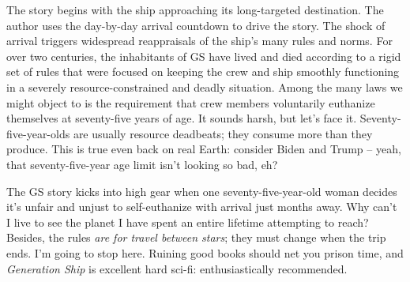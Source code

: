 The story begins with the ship approaching its long-targeted
destination. The author uses the day-by-day arrival countdown to drive
the story. The shock of arrival triggers widespread reappraisals of the
ship's many rules and norms. For over two centuries, the inhabitants of
GS have lived and died according to a rigid set of rules that were
focused on keeping the crew and ship smoothly functioning in a severely
resource-constrained and deadly situation. Among the many laws we might
object to is the requirement that crew members voluntarily euthanize
themselves at seventy-five years of age. It sounds harsh, but let's face
it. Seventy-five-year-olds are usually resource deadbeats; they consume
more than they produce. This is true even back on real Earth: consider
Biden and Trump -- yeah, that seventy-five-year age limit isn't looking
so bad, eh?

The GS story kicks into high gear when one seventy-five-year-old woman
decides it's unfair and unjust to self-euthanize with arrival just
months away. Why can't I live to see the planet I have spent an entire
lifetime attempting to reach? Besides, the rules \emph{are for travel
between stars}; they must change when the trip ends. I'm going to stop
here. Ruining good books should net you prison time, and
\emph{Generation Ship} is excellent hard sci-fi: enthusiastically
recommended.


%
 


